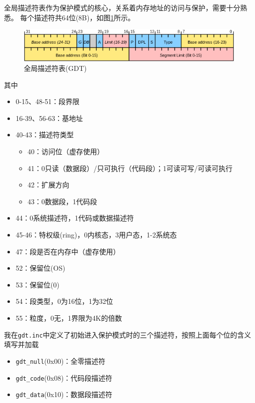 \documentclass[logo,reportComp]{thesis}
\begin{document}
全局描述符表作为保护模式的核心，关系着内存地址的访问与保护，需要十分熟悉。
每个描述符共64位(8B)，如图\ref{fig:gdt}所示。
\begin{figure}[H]
\centering
\includegraphics[width=0.8\linewidth]{fig/gdt.png}
\caption{全局描述符表(GDT)}
\label{fig:gdt}
\end{figure}

其中
\begin{itemize}
	\item 0-15、48-51：段界限
	\item 16-39、56-63：基地址
	\item 40-43：描述符类型
	\begin{itemize}
		\item 40：访问位（虚存使用）
		\item 41：0只读（数据段）/只可执行（代码段）；1可读可写/可读可执行
		\item 42：扩展方向
		\item 43：0数据段，1代码段
	\end{itemize}
	\item 44：0系统描述符，1代码或数据描述符
	\item 45-46：特权级(ring)，0内核态，3用户态，1-2系统态
	\item 47：段是否在内存中（虚存使用）
	\item 52：保留位(OS)
	\item 53：保留位(0)
	\item 54：段类型，0为16位，1为32位
	\item 55：粒度，0无，1界限为4K的倍数
\end{itemize}

我在\verb'gdt.inc'中定义了初始进入保护模式时的三个描述符，按照上面每个位的含义填写并加载
\begin{itemize}
	\item \verb'gdt_null'(0x00)：全零描述符
	\item \verb'gdt_code'(0x08)：代码段描述符
	\item \verb'gdt_data'(0x10)：数据段描述符
\end{itemize}
\end{document}
